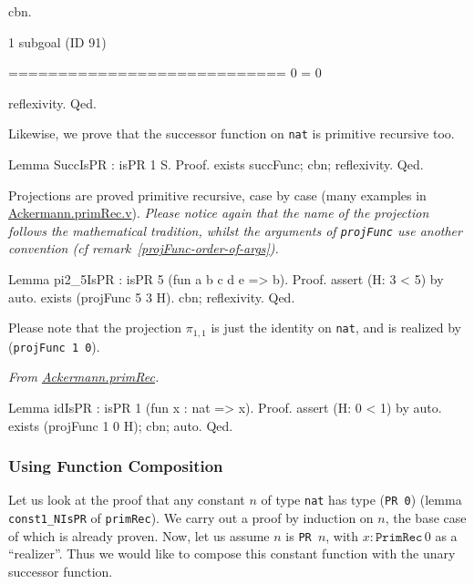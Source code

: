 \begin{Coqsrc}
  cbn.
\end{Coqsrc}


\begin{Coqanswer}
1 subgoal (ID 91)
  
  ============================
  0 = 0
\end{Coqanswer}

\begin{Coqsrc}
  reflexivity.
Qed.
\end{Coqsrc}


Likewise, we prove that the successor function on \texttt{nat} is primitive recursive too.

\begin{Coqsrc}
Lemma SuccIsPR : isPR 1 S.
Proof.
  exists succFunc; cbn; reflexivity.
Qed.
\end{Coqsrc}

Projections are proved primitive recursive, case by case (many examples in 
\href{../theories/html/hydras.primRec.html}{Ackermann.primRec.v}).
\emph{Please notice again that the name of the projection follows the mathematical tradition, 
whilst the arguments of  \texttt{projFunc} use another convention (\emph{cf} remark~\vref{projFunc-order-of-args}).}

\begin{Coqsrc}
Lemma pi2_5IsPR : isPR 5 (fun a b c d e => b).
Proof.
 assert (H: 3 < 5) by auto.
 exists (projFunc 5 3 H).
 cbn; reflexivity.
Qed.
\end{Coqsrc}

Please note that the projection $\pi_{1,1}$ is just the identity on \texttt{nat}, and is realized by 
(\texttt{projFunc 1 0}).


\vspace{4pt}
\noindent
\emph{From \href{../theories/html/hydras.primRec.html}{Ackermann.primRec}.}

\begin{Coqsrc}
Lemma idIsPR : isPR 1 (fun x : nat => x).
Proof.
  assert (H: 0 < 1) by auto.
  exists (projFunc 1 0 H); cbn; auto.
Qed.
\end{Coqsrc}

\subsubsection{Using Function Composition}

Let us look at the proof that any constant $n$ of type \texttt{nat} has type (\texttt{PR 0})
(lemma  \texttt{const1\_NIsPR} of \texttt{primRec}). We carry out a proof by induction on $n$, the base case of which is already proven.
Now, let us assume $n$ is \texttt{PR $n$}, with $x:\texttt{PrimRec}\,0$ as a ``realizer''.
Thus we would like to compose this constant function with the unary successor function.

